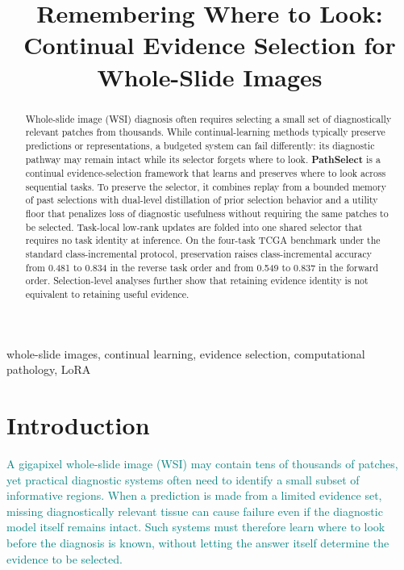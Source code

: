 \documentclass{article}
\title{Remembering Where to Look: Continual Evidence Selection for Whole-Slide Images}
\newif\ifmarkup \markuptrue
\newcommand{\repc}[3]{\ifmarkup\textcolor{gray}{\sout{#2}}\textcolor{#1}{#3}\else#3\fi}
\newcommand{\repG}[2]{\repc{teal}{#1}{#2}}    %
\begin{document}
\ninept
\maketitle

\begin{abstract}
Whole-slide image (WSI) diagnosis often requires selecting a small set of diagnostically relevant patches from thousands. While continual-learning methods typically preserve predictions or representations, a budgeted system can fail differently: its diagnostic pathway may remain intact while its selector forgets where to look. \textbf{PathSelect} is a continual evidence-selection framework that learns and preserves where to look across sequential tasks. To preserve the selector, it combines replay from a bounded memory of past selections with dual-level distillation of prior selection behavior and a utility floor that penalizes loss of diagnostic usefulness without requiring the same patches to be selected. Task-local low-rank updates are folded into one shared selector that requires no task identity at inference. On the four-task TCGA benchmark under the standard class-incremental protocol, preservation raises class-incremental accuracy from 0.481 to 0.834 in the reverse task order and from 0.549 to 0.837 in the forward order. Selection-level analyses further show that retaining evidence identity is not equivalent to retaining useful evidence.
\end{abstract}

\begin{keywords}
whole-slide images, continual learning, evidence selection, computational pathology, LoRA
\end{keywords}

\section{Introduction}
\label{sec:intro}

\repG{}{A gigapixel whole-slide image (WSI) may contain tens of thousands of patches, yet practical diagnostic systems often need to identify a small subset of informative regions. When a prediction is made from a limited evidence set, missing diagnostically relevant tissue can cause failure even if the diagnostic model itself remains intact. Such systems must therefore learn where to look before the diagnosis is known, without letting the answer itself determine the evidence to be selected.}
\end{document}
